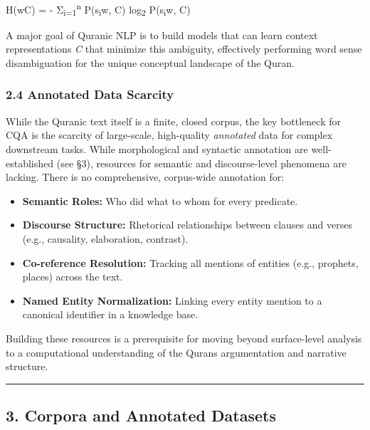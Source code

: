 \documentclass[12pt,a4paper]{article}
\providecommand{\tightlist}{\setlength{\itemsep}{0pt}\setlength{\parskip}{0pt}}
\begin{document}
H(w\textbar C) = - Σ\textsubscript{i=1}\textsuperscript{n}
P(s\textsubscript{i}\textbar w, C) log\textsubscript{2}
P(s\textsubscript{i}\textbar w, C)

A major goal of Quranic NLP is to build models that can learn context
representations \emph{C} that minimize this ambiguity, effectively
performing word sense disambiguation for the unique conceptual landscape
of the Quran.

\subsubsection{2.4 Annotated Data Scarcity}\label{s2-4}

While the Quranic text itself is a finite, closed corpus, the key
bottleneck for CQA is the scarcity of large-scale, high-quality
\emph{annotated} data for complex downstream tasks. While morphological
and syntactic annotation are well-established (see §3), resources for
semantic and discourse-level phenomena are lacking. There is no
comprehensive, corpus-wide annotation for:

\begin{itemize}
\tightlist
\item
  \textbf{Semantic Roles:} Who did what to whom for every predicate.
\item
  \textbf{Discourse Structure:} Rhetorical relationships between clauses
  and verses (e.g., causality, elaboration, contrast).
\item
  \textbf{Co-reference Resolution:} Tracking all mentions of entities
  (e.g., prophets, places) across the text.
\item
  \textbf{Named Entity Normalization:} Linking every entity mention to a
  canonical identifier in a knowledge base.
\end{itemize}

Building these resources is a prerequisite for moving beyond
surface-level analysis to a computational understanding of the
Quran\textquotesingle s argumentation and narrative structure.

\begin{center}\rule{0.5\linewidth}{0.5pt}\end{center}

\protect{}\label{s3}
\subsection{3. Corpora and Annotated
Datasets}\label{corpora-and-annotated-datasets}
\end{document}
